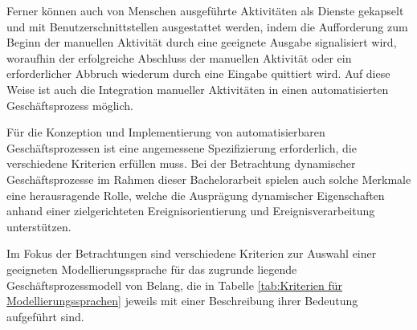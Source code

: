 Ferner können auch von Menschen ausgeführte Aktivitäten als Dienste gekapselt und mit Benutzerschnittstellen ausgestattet werden, indem die Aufforderung zum Beginn der manuellen Aktivität durch eine geeignete Ausgabe signalisiert wird, woraufhin der erfolgreiche Abschluss der manuellen Aktivität oder ein erforderlicher Abbruch wiederum durch eine Eingabe quittiert wird. 
Auf diese Weise ist auch die Integration manueller Aktivitäten in einen automatisierten Geschäftsprozess möglich.
\cite{Weske.2007}

Für die Konzeption und Implementierung von automatisierbaren Geschäftsprozessen ist eine angemessene Spezifizierung erforderlich, die verschiedene Kriterien erfüllen muss.
Bei der Betrachtung dynamischer Geschäftsprozesse im Rahmen dieser Bachelorarbeit spielen auch solche Merkmale eine herausragende Rolle, welche die Ausprägung dynamischer Eigenschaften anhand einer zielgerichteten Ereignisorientierung und Ereignisverarbeitung unterstützen. 

Im Fokus der Betrachtungen sind verschiedene Kriterien zur Auswahl einer geeigneten Modellierungssprache für das zugrunde liegende Geschäftsprozessmodell von Belang, die in Tabelle \ref{tab:Kriterien für Modellierungssprachen} jeweils mit einer Beschreibung ihrer Bedeutung aufgeführt sind.

